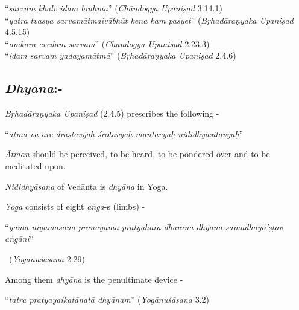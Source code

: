 \begin{myquote}
“\textit{sarvam khalv idam brahma}” (\textit{Chāndogya Upaniṣad} 3.14.1)\\ “\textit{yatra tvasya sarvamātmaivābhūt kena kam paśyet}” (\textit{Bṛhadāraṇyaka Upaniṣad} 4.5.15)\\ “\textit{omkāra evedam sarvam}” (\textit{Chāndogya Upaniṣad} 2.23.3)\\ “\textit{idam sarvam yadayamātmā}” (\textit{Bṛhadāraṇyaka Upaniṣad} 2.4.6)
\end{myquote}


\subsection*{\textit{Dhyāna}:-}

\textit{Bṛhadāraṇyaka Upaniṣad} (2.4.5) prescribes the following -

\begin{myquote}
“\textit{ātmā vā are draṣṭavyaḥ śrotavyaḥ mantavyaḥ nididhyāsitavyaḥ}”
\end{myquote}

\textit{Ātman} should be perceived, to be heard, to be pondered over and to be meditated upon.

\textit{Nididhyāsana} of Vedānta is \textit{dhyāna} in Yoga.

\textit{Yoga} consists of eight \textit{aṅga}-s (limbs) -

\begin{myquote}
“\textit{yama-niyamāsana-prāṇāyāma-pratyāhāra-dhāraṇā-dhyāna-samādhayo’ṣṭāv aṅgāni}” 

~\hfill (\textit{Yogānuśāsana} 2.29)
\end{myquote}

Among them \textit{dhyāna} is the penultimate device -

\begin{myquote}
“\textit{tatra pratyayaikatānatā dhyānam}” (\textit{Yogānuśāsana} 3.2)
\end{myquote}

